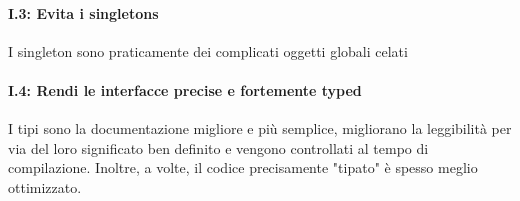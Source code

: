 \paragraph{I.3: Evita i singletons}

\textsf{\small I singleton sono praticamente dei complicati oggetti globali celati} \\ %

\paragraph{I.4: Rendi le interfacce precise e fortemente typed}

\textsf{\small I tipi sono la documentazione migliore e più semplice, migliorano la leggibilità per via del loro significato ben definito e vengono controllati al tempo di compilazione. Inoltre, a volte, il codice precisamente "tipato" è spesso meglio ottimizzato.} \\

